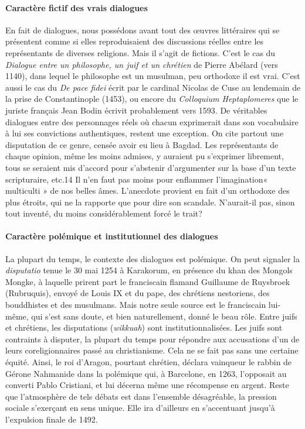\paragraph{Caractère fictif des vrais dialogues}
En fait de dialogues, nous possédons avant tout des œuvres littéraires qui se présentent comme si elles reproduisaient des discussions réelles entre les représentants de diverses religions. Mais il s'agit de fictions. C'est le cas du \textit{Dialogue entre un philosophe, un juif et un chrétien} de Pierre Abélard (vers 1140), dans lequel le philosophe est un musulman, peu orthodoxe il est vrai. C'est aussi le cas du \textit{De pace fidei} écrit par le cardinal Nicolas de Cuse au lendemain de la prise de Constantinople (1453), ou encore du \textit{Colloquium Heptaplomeres} que le juriste français Jean Bodin écrivit probablement vers 1593.
De véritables dialogues entre des personnages réels où chacun exprimerait dans son vocabulaire à lui ses convictions authentiques, restent une exception. On cite partout une disputation de ce genre, censée avoir eu lieu à Bagdad. Les représentants de chaque opinion, même les moins admises, y auraient pu s'exprimer librement, tous se seraient mis d'accord pour s'abstenir d'argumenter sur la base d'un texte scripturaire, etc.14 Il n'en faut pas moins pour enflammer l'imagination« multiculti » de nos belles âmes. L'anecdote provient en fait d'un orthodoxe des plus étroits, qui ne la rapporte que pour
dire son scandale. N'aurait-il pas, sinon tout inventé, du moins considérablement forcé le trait?

\paragraph{Caractère polémique et institutionnel des dialogues}
La plupart du temps, le contexte des dialogues est polémique. On peut signaler la \textit{disputatio} tenue le 30 mai 1254 à Karakorum, en présence du khan des Mongols Mongke, à laquelle prirent part le franciscain flamand Guillaume de Ruysbroek (Rubruquis), envoyé de Louis IX et du pape, des chrétiens nestoriens, des bouddhistes et des musulmans. Mais notre seule source est le franciscain lui-même, qui s'est sans doute, et bien naturellement, donné le beau rôle.
Entre juifs et chrétiens, les disputations (\textit{wikkuah}) sont institutionnalisées. Les juifs sont contraints à disputer, la plupart du temps pour répondre aux accusations d'un de leurs coreligionnaires passé au christianisme. Cela ne se fait pas sans une certaine équité. Ainsi, le roi d'Aragon, pourtant chrétien, déclara vainqueur le rabbin de Gérone Nahmanide dans la polémique qui, à Barcelone, en 1263, l'opposait au converti Pablo Cristiani, et lui décerna même une récompense en argent. Reste que l'atmosphère de tels débats est dans l'ensemble désagréable, la pression sociale s'exerçant en sens unique. Elle ira d'ailleurs en s'accentuant jusqu'à l'expulsion finale de 1492.

